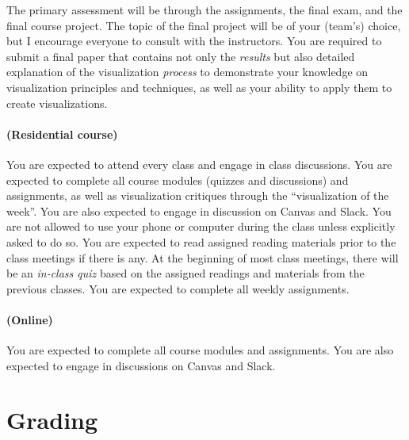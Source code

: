 \documentclass[11pt,article,oneside]{memoir} %
\begin{document}
The primary assessment will be through the assignments, the final exam, and the final course project. 
The topic of the final project will be of your (team's) choice, but I encourage everyone to consult with the instructors. 
You are required to submit a final paper that contains not only the \emph{results} but also detailed explanation of the visualization \emph{process} to demonstrate your knowledge on visualization principles and techniques, as well as your ability to apply them to create visualizations. 


\paragraph{(Residential course)} You are expected to attend every class and engage in class discussions. 
You are expected to complete all course modules (quizzes and discussions) and assignments, as well as visualization critiques through the ``visualization of the week''. You are also expected to engage in discussion on Canvas and Slack. 
You are not allowed to use your phone or computer during the class unless explicitly asked to do so.  
You are expected to read assigned reading materials prior to the class meetings if there is any.
At the beginning of most class meetings, there will be an \emph{in-class quiz} based on the assigned readings and materials from the previous classes. 
You are expected to complete all weekly assignments. 

\paragraph{(Online)} You are expected to complete all course modules and assignments. 
You are also expected to engage in discussions on Canvas and Slack. 

\section{Grading}\label{sec:grading_tentative_}%
\end{document}
